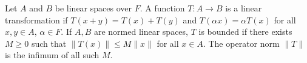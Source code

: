 Let $A$ and $B$ be linear spaces over $F$. A function $T: A \to B$ is a linear transformation if $T(x+y) = T(x) + T(y)$ and $T(\alpha x) = \alpha T(x)$ for all $x,y \in A$, $\alpha \in F$. If $A,B$ are normed linear spaces, $T$ is bounded if there exists $M \ge 0$ such that $\|T(x)\| \le M\|x\|$ for all $x \in A$. The operator norm $\|T\|$ is the infimum of all such $M$.
